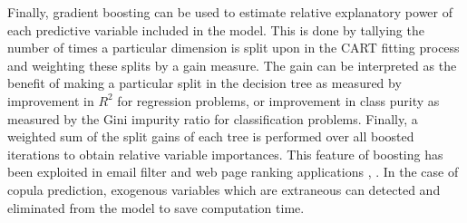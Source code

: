 Finally, gradient boosting can be used to estimate relative explanatory power of each predictive variable included in the model.  This is done by tallying the number of times a particular dimension is split upon in the CART fitting process and weighting these splits by a gain measure.  The gain can be interpreted as the benefit of making a particular split in the decision tree as measured by improvement in $R^2$ for regression problems, or improvement in class purity as measured by the Gini impurity ratio for classification problems.  Finally, a weighted sum of the split gains of each tree is performed over all boosted iterations to obtain relative variable importances.  This feature of boosting has been exploited in email filter and web page ranking applications \cite{chapelle2011}, \cite{Tyree2011}.  In the case of copula prediction, exogenous variables which are extraneous can detected and eliminated from the model to save computation time.
